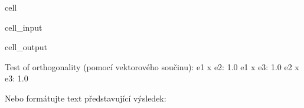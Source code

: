 \documentclass[letterpaper,10pt,english]{jupyterBook}
\begin{document}
\begin{sphinxuseclass}{cell}\begin{sphinxVerbatimInput}

\begin{sphinxuseclass}{cell_input}
\begin{sphinxVerbatim}[commandchars=\\\{\}]
        
        
        
\end{sphinxVerbatim}

\end{sphinxuseclass}\end{sphinxVerbatimInput}
\begin{sphinxVerbatimOutput}

\begin{sphinxuseclass}{cell_output}
\begin{sphinxVerbatim}[commandchars=\\\{\}]
Test of orthogonality (pomocí vektorového součinu): 
e1 x e2: 1.0 
e1 x e3: 1.0 
e2 x e3: 1.0
\end{sphinxVerbatim}

\end{sphinxuseclass}\end{sphinxVerbatimOutput}

\end{sphinxuseclass}
\sphinxAtStartPar
Nebo formátujte text představující výsledek:
\end{document}
